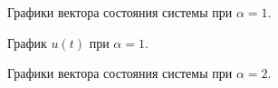\begin{figure}[!h]
	\caption{Графики вектора состояния системы при $\alpha = 1$.}
	\label{4_4_x_1}
\end{figure}

\begin{figure}[!h]
	\caption{График $u(t)$ при $\alpha = 1$.}
	\label{4_4_u_1}
\end{figure}


\begin{figure}[!h]
	\caption{Графики вектора состояния системы при $\alpha = 2$.}
	\label{4_4_x_2}
\end{figure}

